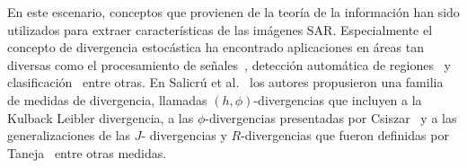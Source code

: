 \documentclass[11pt]{article}
\begin{document}

En este escenario, conceptos que provienen de la teoría de la información han sido utilizados para extraer características de las imágenes SAR. Especialmente el concepto de divergencia estocástica ha encontrado aplicaciones en áreas tan diversas como el procesamiento de señales~\cite {Aviyente2007}, detección automática de regiones~\cite{Nascimento2009,SilvaCribariFrery:ImprovedLikelihood:Environmetrics} y clasificación~\cite{Puig2003} entre otras. 
En Salicrú et al.~\cite{Salicru1994} los autores propusieron una familia de medidas de divergencia, llamadas $(h,\phi)$-divergencias que incluyen a la Kulback Leibler divergencia, a las $\phi$-divergencias presentadas por Csiszar~\cite{Csiszar1967} y a las generalizaciones de las $J$- divergencias y $R$-divergencias que fueron definidas por Taneja~\cite{Taneja1989} entre otras medidas. 
\end{document}
